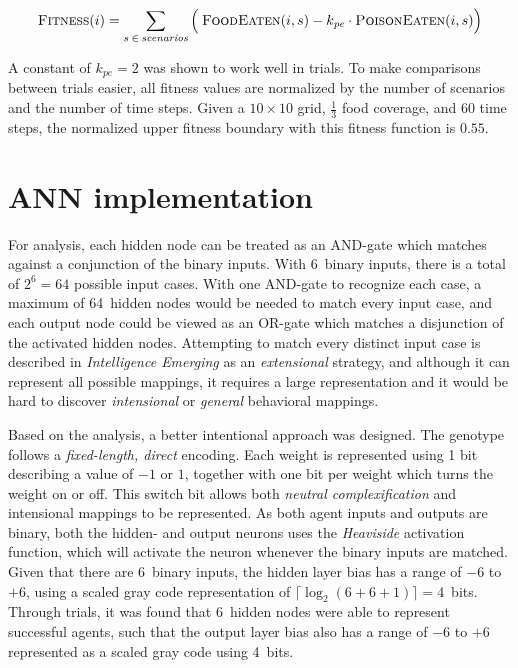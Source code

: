 \documentclass[paper=a4, fontsize=11pt]{scrartcl}
\begin{document}
\begin{equation}
\label{eq:fitness_function}
\textsc{Fitness}(i) = \sum_{s\:\in\:\mathit{scenarios}} \Big(\: \textsc{FoodEaten}(i, s) - k_{\mathit{pe}} \cdot \textsc{PoisonEaten}(i, s)\Big)
\end{equation}

A constant of $k_{\mathit{pe}} = 2$ was shown to work well in trials. To make comparisons between trials easier, all fitness values are normalized by the number of scenarios and the number of time steps. Given a $10 \times 10$ grid, $\frac{1}{3}$ food coverage, and 60 time steps, the normalized upper fitness boundary with this fitness function is $0.55$.

\section{\ac{ANN} implementation}

For analysis, each hidden node can be treated as an \textsc{AND}-gate which matches against a conjunction of the binary inputs. With 6~binary inputs, there is a total of $2^6 = 64$ possible input cases. With one \textsc{AND}-gate to recognize each case, a maximum of 64~hidden nodes would be needed to match every input case, and each output node could be viewed as an \textsc{OR}-gate which matches a disjunction of the activated hidden nodes. Attempting to match every distinct input case is described in \textit{Intelligence Emerging} as an \textit{extensional} strategy, and although it can represent all possible mappings, it requires a large representation and it would be hard to discover \textit{intensional} or \textit{general} behavioral mappings.

Based on the analysis, a better intentional approach was designed. The genotype follows a \textit{fixed-length, direct} encoding. Each weight is represented using 1 bit describing a value of $-1$ or $1$, together with one bit per weight which turns the weight on or off. This switch bit allows both \textit{neutral complexification} and intensional mappings to be represented. As both agent inputs and outputs are binary, both the hidden- and output neurons uses the \textit{Heaviside} activation function, which will activate the neuron whenever the binary inputs are matched. Given that there are 6~binary inputs, the hidden layer bias has a range of $-6$ to $+6$, using a scaled gray code representation of $\lceil \log_2 (6 + 6 + 1) \rceil = 4$~bits. Through trials, it was found that 6~hidden nodes were able to represent successful agents, such that the output layer bias also has a range of $-6$ to $+6$ represented as a scaled gray code using 4~bits.
\end{document}
